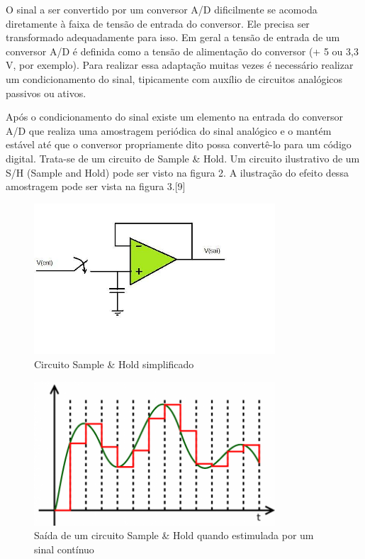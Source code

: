 O sinal a ser convertido por um conversor A/D dificilmente se acomoda diretamente à faixa de tensão de entrada do conversor. Ele precisa ser transformado adequadamente para isso. Em geral a tensão de entrada de um conversor A/D é definida como a tensão de alimentação do conversor (+ 5 ou 3,3 V, por exemplo). Para realizar essa adaptação muitas vezes é necessário realizar um condicionamento do sinal, tipicamente com auxílio de circuitos analógicos passivos ou ativos.

Após o condicionamento do sinal existe um elemento na entrada do conversor A/D que realiza uma amostragem periódica do sinal analógico e o mantém estável até que o conversor propriamente dito possa convertê-lo para um código digital. Trata-se de um circuito de Sample \& Hold. Um circuito ilustrativo de um S/H (Sample and Hold) pode ser visto na figura 2. A ilustração do efeito dessa amostragem pode ser vista na figura 3.[9]

\begin{figure}[H]
	\centering
	\includegraphics[width=9cm]{figuras/circuito_sample.jpg}
	\caption{Circuito Sample \& Hold simplificado} \label{circuito_sample}
\end{figure}

\begin{figure}[H]
	\centering
	\includegraphics[width=9cm]{figuras/saida_sample.png}
	\caption{Saída de um circuito Sample \& Hold quando estimulada por um sinal contínuo} \label{saida_sample}
\end{figure}

